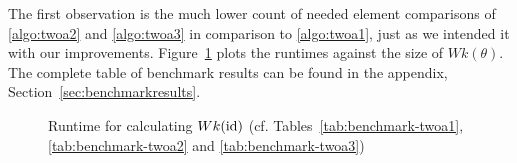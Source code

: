 The first observation is the much lower count of needed element comparisons of \ref{algo:twoa2} and \ref{algo:twoa3} in comparison to \ref{algo:twoa1}, just as we intended it with our improvements. Figure~\ref{fig:twoa123-runtime} plots the runtimes against the size of $Wk(\theta)$. The complete table of benchmark results can be found in the appendix, Section~\ref{sec:benchmarkresults}.

\begin{figure}[ht]
	\centering
	\caption{Runtime for calculating $Wk(\operatorname{id})$ (cf. Tables~\ref{tab:benchmark-twoa1}, \ref{tab:benchmark-twoa2} and \ref{tab:benchmark-twoa3})}
	\label{fig:twoa123-runtime}
\end{figure}
